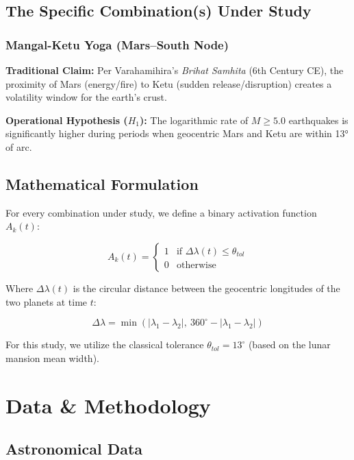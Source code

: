\documentclass[
  11pt,
  a4paper,
  oneside,
  openany]{article}
\begin{document}
\subsection{The Specific Combination(s) Under
Study}\label{the-specific-combinations-under-study}

\subsubsection{Mangal-Ketu Yoga (Mars--South
Node)}\label{mangal-ketu-yoga-marssouth-node}

\textbf{Traditional Claim:} Per Varahamihira's \emph{Brihat Samhita}
(6th Century CE), the proximity of Mars (energy/fire) to Ketu (sudden
release/disruption) creates a volatility window for the earth's crust.

\textbf{Operational Hypothesis (\(H_1\)):} The logarithmic rate of
\(M \ge 5.0\) earthquakes is significantly higher during periods when
geocentric Mars and Ketu are within 13° of arc.

\subsection{Mathematical Formulation}\label{mathematical-formulation}

For every combination under study, we define a binary activation
function \(A_k(t)\):

\[ A_k(t) =
\begin{cases}
1 & \text{if } \Delta\lambda(t) \leq \theta_{tol} \\
0 & \text{otherwise}
\end{cases} \]

Where \(\Delta\lambda(t)\) is the circular distance between the
geocentric longitudes of the two planets at time \(t\):

\[ \Delta\lambda = \min\left(|\lambda_1 - \lambda_2|,\ 360^\circ - |\lambda_1 - \lambda_2|\right) \]

For this study, we utilize the classical tolerance
\(\theta_{tol} = 13^\circ\) (based on the lunar mansion mean width).

\section{Data \& Methodology}\label{data-methodology}

\subsection{Astronomical Data}\label{astronomical-data}
\end{document}
